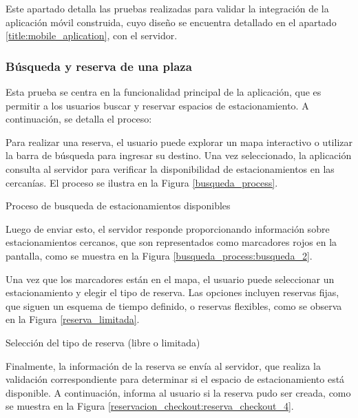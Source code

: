 Este apartado detalla las pruebas realizadas para validar la integración de la aplicación móvil construida, cuyo diseño se encuentra detallado en el apartado \ref{title:mobile_aplication}, con el servidor.

\subsubsection{Búsqueda y reserva de una plaza}


Esta prueba se centra en la funcionalidad principal de la aplicación, que es permitir a los usuarios buscar y reservar espacios de estacionamiento. A continuación, se detalla el proceso:

Para realizar una reserva, el usuario puede explorar un mapa interactivo o utilizar la barra de búsqueda para ingresar su destino. Una vez seleccionado, la aplicación consulta al servidor para verificar la disponibilidad de estacionamientos en las cercanías. El proceso se ilustra en la Figura \ref{busqueda_process}.

\begin{images}[\label{busqueda_process}]{Proceso de busqueda de estacionamientos disponibles}
\end{images}

Luego de enviar esto, el servidor responde proporcionando información sobre estacionamientos cercanos, que son representados como marcadores rojos en la pantalla, como se muestra en la Figura \ref{busqueda_process:busqueda_2}.

Una vez que los marcadores están en el mapa, el usuario puede seleccionar un estacionamiento y elegir el tipo de reserva. Las opciones incluyen reservas fijas, que siguen un esquema de tiempo definido, o reservas flexibles, como se observa en la Figura \ref{reserva_limitada}.

\begin{images}[\label{reserva_process}]{Selección del tipo de reserva (libre o limitada)}
\end{images}

Finalmente, la información de la reserva se envía al servidor, que realiza la validación correspondiente para determinar si el espacio de estacionamiento está disponible. A continuación, informa al usuario si la reserva pudo ser creada, como se muestra en la Figura \ref{reservacion_checkout:reserva_checkout_4}.


